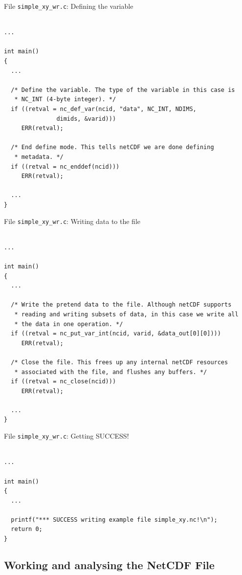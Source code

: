 \documentclass[compress,11pt,xcolor=svgnames,aspectratio=169]{beamer}
\begin{document}
\begin{frame}[fragile]{File \texttt{simple\_xy\_wr.c}: Defining the variable}

{\tiny

\begin{verbatim}

...

int main()
{
  ...

  /* Define the variable. The type of the variable in this case is
   * NC_INT (4-byte integer). */
  if ((retval = nc_def_var(ncid, "data", NC_INT, NDIMS,
               dimids, &varid)))
     ERR(retval);

  /* End define mode. This tells netCDF we are done defining
   * metadata. */
  if ((retval = nc_enddef(ncid)))
     ERR(retval);

  ...
}

\end{verbatim}

}

\end{frame}

\begin{frame}[fragile]{File \texttt{simple\_xy\_wr.c}: Writing data to the file}

{\tiny

\begin{verbatim}

...

int main()
{
  ...

  /* Write the pretend data to the file. Although netCDF supports
   * reading and writing subsets of data, in this case we write all
   * the data in one operation. */
  if ((retval = nc_put_var_int(ncid, varid, &data_out[0][0])))
     ERR(retval);

  /* Close the file. This frees up any internal netCDF resources
   * associated with the file, and flushes any buffers. */
  if ((retval = nc_close(ncid)))
     ERR(retval);

  ...
}

\end{verbatim}

}

\end{frame}

\begin{frame}[fragile]{File \texttt{simple\_xy\_wr.c}: Getting SUCCESS!}

{\tiny

\begin{verbatim}

...

int main()
{
  ...

  printf("*** SUCCESS writing example file simple_xy.nc!\n");
  return 0;
}

\end{verbatim}

}

\subsection{Working and analysing the NetCDF File}

\end{frame}
\end{document}
